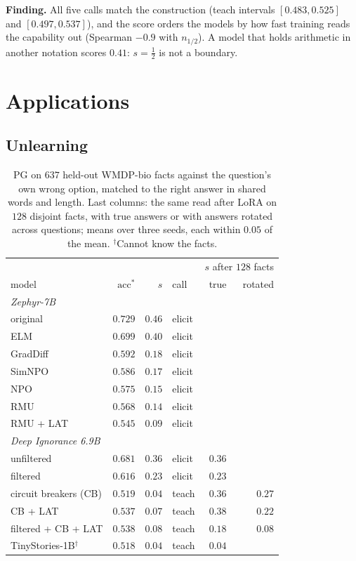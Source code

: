 \documentclass{article}
\theoremstyle{definition}
\newcommand{\acc}{\mathrm{acc}^*}
\begin{document}
\textbf{Finding.} All five calls match the construction (teach intervals $[0.483, 0.525]$ and $[0.497, 0.537]$),
and the score orders the models by how fast training reads the capability out (Spearman $-0.9$ with $n_{1/2}$).
A model that holds arithmetic in another notation scores $0.41$: $s=\tfrac12$ is not a boundary.

\section{Applications}
\label{sec:apps}

\subsection{Unlearning}
\label{sec:unlearning}

\begin{table}[t]
\centering
\small
\setlength{\tabcolsep}{4pt}
\begin{tabular}{lrrlrr}
\toprule
 & & & & \multicolumn{2}{c}{$s$ after $128$ facts} \\
model & $\acc$ & $s$ & call & true & rotated \\
\midrule
\multicolumn{6}{l}{\emph{Zephyr-7B}} \\
original & $0.729$ & $0.46$ & elicit & & \\
ELM & $0.699$ & $0.40$ & elicit & & \\
GradDiff & $0.592$ & $0.18$ & elicit & & \\
SimNPO & $0.586$ & $0.17$ & elicit & & \\
NPO & $0.575$ & $0.15$ & elicit & & \\
RMU & $0.568$ & $0.14$ & elicit & & \\
RMU + LAT & $0.545$ & $0.09$ & elicit & & \\
\midrule
\multicolumn{6}{l}{\emph{Deep Ignorance 6.9B}} \\
unfiltered & $0.681$ & $0.36$ & elicit & $0.36$ & \\
filtered & $0.616$ & $0.23$ & elicit & $0.23$ & \\
circuit breakers (CB) & $0.519$ & $0.04$ & teach & $0.36$ & $0.27$ \\
CB + LAT & $0.537$ & $0.07$ & teach & $0.38$ & $0.22$ \\
filtered + CB + LAT & $0.538$ & $0.08$ & teach & $0.18$ & $0.08$ \\
\midrule
TinyStories-1B$^\dagger$ & $0.518$ & $0.04$ & teach & $0.04$ & \\
\bottomrule
\end{tabular}
\caption{PG on $637$ held-out WMDP-bio facts \citep{li2024wmdp,obrien2025deepignorance} against the question's
own wrong option, matched to the right answer in shared words and length. Last columns: the same read after LoRA
on $128$ disjoint facts, with true answers or with answers rotated across questions; means over three seeds, each
within $0.05$ of the mean. $^\dagger$Cannot know the
facts.}
\label{tab:unlearn}
\end{table}
\end{document}
